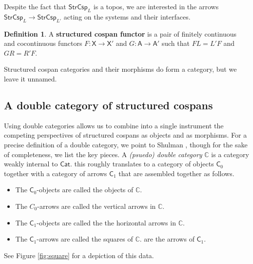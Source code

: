 \documentclass{amsart}
\newcommand{\A}{\cat{A}}
\newcommand{\C}{\cat{C}}
\newcommand{\X}{\cat{X}}
\newcommand{\CCC}{\dblcat{C}}
\newcommand{\Cat}{\cat{Cat}}
\newcommand{\StrCsp}{\cat{StrCsp}}
\newcommand{\defn}[1]{\textbf{#1}}
\newcommand{\cat}[1]{\mathsf{#1}}
\newcommand{\dblcat}[1]{\mathbb{#1}}
\newcommand{\from}{\colon}
\theoremstyle{remark}
\theoremstyle{definition}
\newtheorem{definition}[theorem]{Definition}
\begin{document}
Despite the fact that $ \StrCsp_L $ is a topos, we are interested in
the arrows $ \StrCsp_L \to \StrCsp_{L'} $ acting on the systems and
their interfaces.

\begin{definition} \label{def:str-csp-functor}
%
  A \defn{structured cospan functor} is a pair of finitely continuous
  and cocontinuous functors $ F \from \X \to \X' $ and
  $ G \from \A \to \A' $ such that $ FL=L'F $ and $ GR = R'F $.
\end{definition}

Structured cospan categories and their morphisms do form a category, but
we leave it unnamed.


\subsection{A double category of structured cospans}
\label{sec:DblCatOfStrCsp}

Using double categories allows us to combine into a single instrument
the competing perspectives of structured cospans as objects and as
morphisms. For a precise definition of a double category, we point to
Shulman \cite{ShulDblCat}, though for the sake of completeness, we
list the key pieces. A \emph{(psuedo) double category} $ \CCC $ is a category
weakly internal to $ \Cat $. this roughly translates to a category of
objects $ \C_0 $ together with a category of arrows $ \C_1 $ that are
assembled together as follows.
% 
\begin{itemize}
\item The $ \C_0 $-objects are called the objects of $ \CCC $.
\item The $ C_0 $-arrows are called the vertical arrows in $ \CCC $.
\item The $ \C_1 $-objects are called the the horizontal arrows in $ \CCC $. 
\item The $ \C_1 $-arrows are called the squares of $ \CCC $.
are the arrows of $ \C_1 $. 
\end{itemize}
%
See Figure \ref{fig:square} for a depiction of this data.
\end{document}
